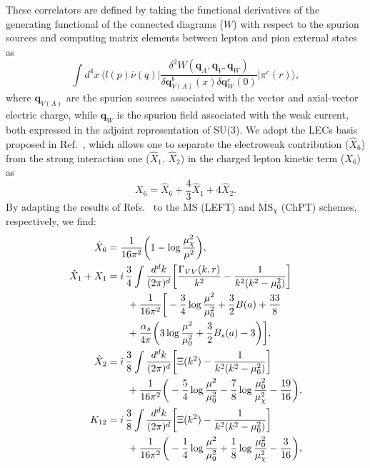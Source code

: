 \documentclass[prl,twocolumn,twoside,preprintnumbers,superscriptaddress,nofootinbib,letterpaper]{revtex4-1}
\begin{document}
These correlators are defined by taking the functional derivatives of the generating functional of the connected diagrams ($W$) with respect to the spurion sources and computing matrix elements between lepton and pion external states as
\begin{equation}
    \int d^{4}x\,\bigg\langle l(p)\bar{\nu}(q) \bigg| \frac{\delta^{2} W(\mathbf{q}_{A},\mathbf{q}_{V},\mathbf{q}_{W})}{\delta\mathbf{q}^{b}_{V(A)}(x)\delta\mathbf{q}_{W}^{c}(0)}\bigg|\pi^{c}(r)\bigg\rangle,
\end{equation}
where $\mathbf{q}_{V(A)}$ are the spurion sources associated with the vector and axial-vector electric charge, while $\mathbf{q}_{W}$ is the spurion field associated with the weak current, both expressed in the adjoint representation of SU(3). We adopt the LECs basis proposed in Ref.~\cite{Descotes-Genon:2005wrq}, which allows one to separate the electroweak contribution ($\hat{X}_{6}$) from the strong interaction one ($\hat{X}_{1}$, $\hat{X}_{2}$) in the charged lepton kinetic term ($X_{6}$) as
\begin{equation}
    X_{6} = \hat{X}_{6} + \frac{4}{3} \hat{X}_{1}+4\hat{X}_{2}.
\end{equation}
By adapting the results of Refs.~\cite{Descotes-Genon:2005wrq,Moussallam:1997xx} to the $\overline{\text{MS}}$ (LEFT) and  $\overline{\text{MS}}_\chi$ (ChPT) schemes, respectively, we find:
\begin{align}
\label{eq:LECs_separate}
    \hat{X}_{6} &= \frac{1}{16 \pi^2}\bigg(1- \log\frac{\mu^{2}_{\chi}}{\mu^{2}}\bigg),\\

    \hat{X}_{1}+X_{1} &= i\,\frac{3}{4}\int \frac{d^{d}k}{(2 \pi)^{d}} \bigg[ \frac{\Gamma_{VV}(k,r)}{k^{2}}-\frac{1}{k^{2}(k^{2}-\mu_{0}^{2})}\bigg] \nonumber \\
    &\qquad+ \frac{1}{16\pi^{2}}\bigg[-\frac{3}{4}\log\frac{\mu^{2}}{\mu_{0}^{2}}+\frac{3}{2}B(a)+\frac{33}{8} \notag\\
    &\qquad+ \frac{\alpha_{s}}{4\pi}\bigg( 3\log\frac{\mu^{2}}{\mu_{0}^{2}}+ \frac{3}{2} B_{s}(a) -3 \bigg)\bigg],\notag\\

    \hat{X}_{2} &= i\, \frac{3}{8} \int \frac{d^{d}k}{(2 \pi)^{d}}\bigg[\Xi(k^2)-\frac{1}{k^2(k^2-\mu_{0}^{2})} \bigg]\nonumber\\
    &\qquad+\frac{1}{16\pi^{2}}\bigg(-\frac{5}{4}\log\frac{\mu^{2}}{\mu_{0}^{2}}-\frac{7}{8}\log\frac{\mu_{0}^{2}}{\mu_{\chi}^{2}}-\frac{19}{16}\bigg),\notag\\

    K_{12} &= i\, \frac{3}{8} \int \frac{d^{d}k}{(2 \pi)^{d}}\bigg[\Xi(k^2)-\frac{1}{k^2(k^2-\mu_{0}^{2})}\bigg] \nonumber\\
    &\qquad+\frac{1}{16\pi^{2}}\bigg(-\frac{1}{4}\log\frac{\mu^{2}}{\mu_{0}^{2}}+\frac{1}{8}\log\frac{\mu_{0}^{2}}{\mu_{\chi}^{2}}-\frac{3}{16}\bigg),\notag
\end{align}
\end{document}

